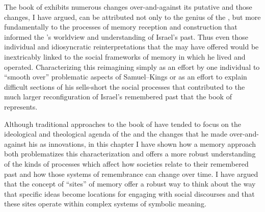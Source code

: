 The book of \chronicles exhibits numerous changes over-and-against its putative \vorlage and those changes, I have argued, can be attributed not only to the genius of the \chronicler, but more fundamentally to the processes of memory reception and construction that informed the \chronicler's worldview and understanding of Israel's past. Thus even those individual and idiosyncratic reinterpretations that the \chronicler may have offered would be inextricably linked to the social frameworks of memory in which he lived and operated. Characterizing this reimagining simply as an effort by one individual to ``smooth over'' problematic aspects of Samuel--Kings or as an effort to explain difficult sections of his \vorlage sells-short the social processes that contributed to the much larger reconfiguration of Israel's remembered past that the book of \chronicles represents.

Although traditional approaches to the book of \chronicles have tended to focus on the ideological and theological agenda of the \chronicler and the changes that he made over-and-against his \vorlage as innovations, in this chapter I have shown how a memory approach both problematizes this characterization and offers a more robust understanding of the kinds of processes which affect how societies relate to their remembered past and how those systems of remembrance can change over time. I have argued that the concept of ``sites'' of memory offer a robust way to think about the way that specific ideas become locations for engaging with social discourses and that these sites operate within complex systems of symbolic meaning.

